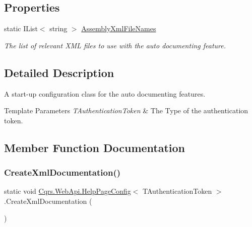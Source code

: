 \subsection*{Properties}
\begin{DoxyCompactItemize}
\item 
static I\+List$<$ string $>$ \hyperlink{classCqrs_1_1WebApi_1_1HelpPageConfig_a62d6b1d61b668f53f5394b26e1c0b0fa_a62d6b1d61b668f53f5394b26e1c0b0fa}{Assembly\+Xml\+File\+Names}
\begin{DoxyCompactList}\small\item\em The list of relevant X\+ML files to use with the auto documenting feature. \end{DoxyCompactList}\end{DoxyCompactItemize}


\subsection{Detailed Description}
A start-\/up configuration class for the auto documenting features. 


\begin{DoxyTemplParams}{Template Parameters}
{\em T\+Authentication\+Token} & The Type of the authentication token.\\
\hline
\end{DoxyTemplParams}


\subsection{Member Function Documentation}
\mbox{\label{classCqrs_1_1WebApi_1_1HelpPageConfig_a9dc5b7b2b644637cd8216ffaac68d545_a9dc5b7b2b644637cd8216ffaac68d545}} 
\subsubsection{\texorpdfstring{Create\+Xml\+Documentation()}{CreateXmlDocumentation()}}
{\footnotesize\ttfamily static void \hyperlink{classCqrs_1_1WebApi_1_1HelpPageConfig}{Cqrs.\+Web\+Api.\+Help\+Page\+Config}$<$ T\+Authentication\+Token $>$.Create\+Xml\+Documentation (\begin{DoxyParamCaption}{ }\end{DoxyParamCaption})\hspace{0.3cm}{\ttfamily [static]}}




